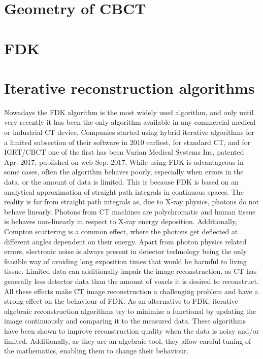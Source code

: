 \section{Geometry of CBCT}

\section{FDK}

\section{Iterative reconstruction algorithms}
Nowadays the FDK algorithm is the most widely used algorithm, and only until very recently it has been the only algorithm available in any commercial medical or industrial CT device. Companies started using hybrid iterative algorithms for a limited subsection of their software in 2010 earliest\cite{geyer2015state}, for standard CT, and for IGRT/CBCT one of the first has been Varian Medical Systems Inc, patented Apr. 2017\cite{paysan2017iterative}, published on web Sep. 2017\cite{Varian}.  While using FDK is advantageous in some cases, often the algorithm behaves poorly, especially when errors in the data, or the amount of data is limited. This is because FDK is based on an analytical approximation of straight path integrals in continuous spaces. The reality is far from straight path integrals as, due to X-ray physics, photons do not behave linearly. Photons from CT machines are polychromatic and human tissue is behaves non-linearly in respect to X-ray energy deposition. Additionally, Compton scattering is a common effect, where the photons get deflected at different angles dependent on their energy. Apart from photon physics related errors, electronic noise is always present in detector technology being the only feasible way of avoiding  long exposition times that would be harmful to living tissue. Limited data can additionally impair the image reconstruction, as CT has generally less detector data than the amount of voxels it is desired to reconstruct. All these effects make CT image reconstruction a challenging problem and have a strong effect on the behaviour of FDK. As an alternative to FDK, iterative algebraic reconstruction algorithms try to minimize a functional by updating the image continuously and comparing it to the measured data. These algorithms have been shown to improve reconstruction quality when the data is noisy and/or limited. Additionally, as they are an algebraic tool, they allow careful tuning of the mathematics, enabling them to change their behaviour.


